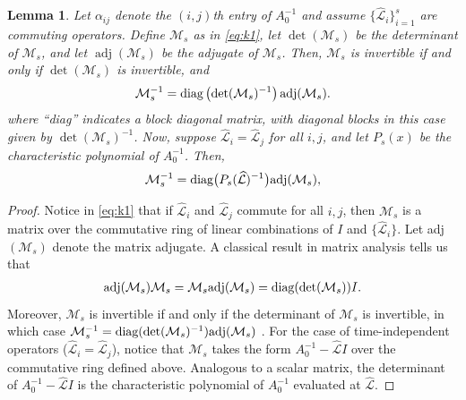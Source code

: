 \documentclass[a4paper,10pt]{article}
\newtheorem{lemma}{Lemma}
\DeclareMathOperator{\adj}{adj}
\begin{document}
%
\begin{lemma}\label{lem:inv}
Let $\alpha_{ij}$ denote the $(i,j)$th entry of $A_0^{-1}$ and assume
$\{\widehat{\mathcal{L}}_i\}_{i=1}^s$ are commuting operators. Define $\mathcal{M}_s$
as in \eqref{eq:k1},
let $\det(\mathcal{M}_s)$ be the determinant of $\mathcal{M}_s$,
and let $\adj(\mathcal{M}_s)$ be the adjugate of $\mathcal{M}_s$. Then, $\mathcal{M}_s$
is invertible if and only if $\det(\mathcal{M}_s)$ is invertible, and
\begin{align*}
\mathcal{M}_s^{-1} = \textnormal{diag}\left(\det(\mathcal{M}_s)^{-1}\right)
	\textnormal{adj}(\mathcal{M}_s).
\end{align*}
%
where ``diag'' indicates a block diagonal matrix, with diagonal blocks in this
case given by $\det(\mathcal{M}_s)^{-1}$.
Now, suppose $\widehat{\mathcal{L}}_i = \widehat{\mathcal{L}}_j$ for
all $i,j$, and let $P_s(x)$ be the characteristic polynomial of $A_0^{-1}$. Then,
\begin{align*}
\mathcal{M}_s^{-1} = \textnormal{diag}\big(P_s(\widehat{\mathcal{L}})^{-1}\big)\textnormal{adj}(\mathcal{M}_s),
\end{align*}
\end{lemma}
\begin{proof}
Notice in \eqref{eq:k1} that if $\widehat{\mathcal{L}}_i$ and $\widehat{\mathcal{L}}_j$ commute for all $i,j$,
then $\mathcal{M}_s$ is a matrix over the commutative ring of linear combinations
of $I$ and $\{\widehat{\mathcal{L}}_i\}$. Let adj$(\mathcal{M}_s)$ denote the matrix adjugate. A
classical result in matrix analysis tells us that
%
\begin{align*}
\textnormal{adj}(\mathcal{M}_s)\mathcal{M}_s = \mathcal{M}_s\textnormal{adj}(\mathcal{M}_s)
	= \textnormal{diag}(\det(\mathcal{M}_s))I.
\end{align*}
%
Moreover, $\mathcal{M}_s$ is invertible if and only if the determinant of $\mathcal{M}_s$
is invertible, in which case $\mathcal{M}_s^{-1} = \textnormal{diag}
(\det(\mathcal{M}_s)^{-1})\textnormal{adj}(\mathcal{M}_s)$
\cite[Theorem 2.19 \& Corollary 2.21]{brown1993matrices}.
For the case of time-independent operators ($\widehat{\mathcal{L}}_i=\widehat{\mathcal{L}}_j$), notice that
$\mathcal{M}_s$ takes the form $A_0^{-1} - \widehat{\mathcal{L}}I$ over the commutative ring defined
above. Analogous to a scalar matrix, the determinant of $A_0^{-1} - \widehat{\mathcal{L}}I$ is the
characteristic polynomial of $A_0^{-1}$ evaluated at $\widehat{\mathcal{L}}$.
\end{proof}
%
\end{document}
